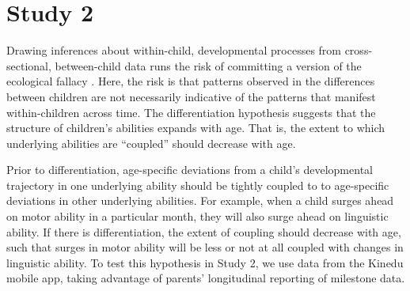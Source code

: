 \documentclass[man, floatsintext]{apa7}
\begin{document}
\section{Study 2}

%
Drawing inferences about within-child, developmental processes from cross-sectional, between-child data runs the risk of committing a version of the ecological fallacy \parencite{piantadosi1988}. Here, the risk is that patterns observed in the differences between children are not necessarily indicative of the patterns that manifest within-children across time.
The differentiation hypothesis suggests that the structure of children's
abilities expands with age. That is, the extent to which underlying abilities are ``coupled'' should decrease with age.

Prior to differentiation, age-specific deviations from a child's developmental trajectory in one underlying ability should be tightly coupled to to age-specific deviations in other underlying abilities. For example, when a child surges ahead on motor ability in a particular month, they will also surge ahead on linguistic ability. If there is differentiation, the extent of coupling should decrease with age, such that surges in motor ability will be less or not at all coupled with changes in linguistic ability. To test this hypothesis in Study 2, we use data from the Kinedu mobile app, taking advantage of parents' longitudinal reporting of milestone data.
%
\end{document}
